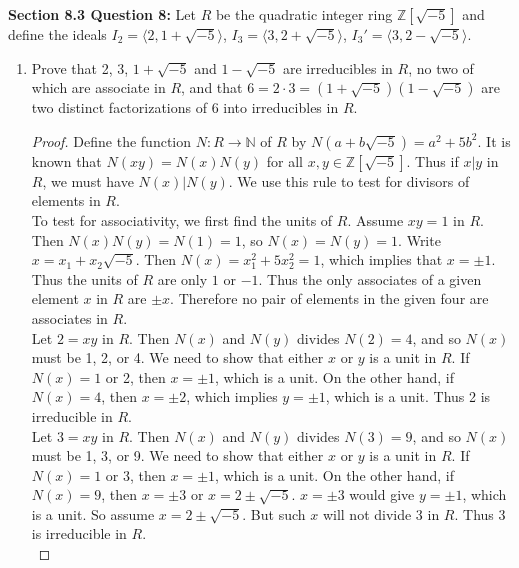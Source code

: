 \documentclass{article}
\begin{document}
\textbf{Section 8.3 Question 8:} Let $R$ be the quadratic integer ring
  $\mathbb{Z}[\sqrt{-5}]$ and define the ideals
  $I_2=\langle2,1+\sqrt{-5}\rangle$, $I_3=\langle3,2+\sqrt{-5}\rangle$,
  $I_3'=\langle3,2-\sqrt{-5}\rangle$.

  \begin{enumerate}[label={\bf(\alph*)}]
    \item Prove that 2, 3, $1+\sqrt{-5}$ and $1-\sqrt{-5}$ are irreducibles
      in $R$, no two of which are associate in $R$, and that
      $6=2\cdot3=(1+\sqrt{-5})(1-\sqrt{-5})$ are two distinct
      factorizations of 6 into irreducibles in $R$.

      \begin{proof}
        Define the function $N:R\rightarrow\mathbb{N}$ of $R$ by
        $N(a+b\sqrt{-5})=a^2+5b^2$. It is known that $N(xy)=N(x)N(y)$ for
        all $x,y\in\mathbb{Z}[\sqrt{-5}]$. Thus if $x|y$ in $R$, we must
        have $N(x)|N(y)$. We use this rule to test for divisors of elements
        in $R$. \\

        To test for associativity, we first find the units of $R$.
        Assume $xy=1$ in $R$. Then $N(x)N(y)=N(1)=1$, so $N(x)=N(y)=1$.
        Write $x=x_1+x_2\sqrt{-5}$. Then $N(x)=x_1^2+5x_2^2=1$, which
        implies that $x=\pm1$. Thus the units of $R$ are only $1$ or $-1$.
        Thus the only associates of a given element $x$ in $R$ are $\pm x$.
        Therefore no pair of elements in the given four are associates in
        $R$. \\

        Let $2=xy$ in $R$. Then $N(x)$ and $N(y)$ divides $N(2)=4$, and so
        $N(x)$ must be 1, 2, or 4. We need to show that either $x$ or $y$
        is a unit in $R$. If $N(x)=1$ or 2, then $x=\pm1$, which is a unit.
        On the other hand, if $N(x)=4$, then $x=\pm2$, which implies
        $y=\pm1$, which is a unit. Thus 2 is irreducible in $R$. \\

        Let $3=xy$ in $R$. Then $N(x)$ and $N(y)$ divides $N(3)=9$, and so
        $N(x)$ must be 1, 3, or 9. We need to show that either $x$ or $y$
        is a unit in $R$. If $N(x)=1$ or 3, then $x=\pm1$, which is a unit.
        On the other hand, if $N(x)=9$, then $x=\pm3$ or $x=2\pm\sqrt{-5}$.
        $x=\pm3$ would give $y=\pm1$, which is a unit. So assume
        $x=2\pm\sqrt{-5}$. But such $x$ will not divide 3 in $R$. Thus 3 is
        irreducible in $R$. \\


\end{proof}
\end{enumerate}
\end{document}
